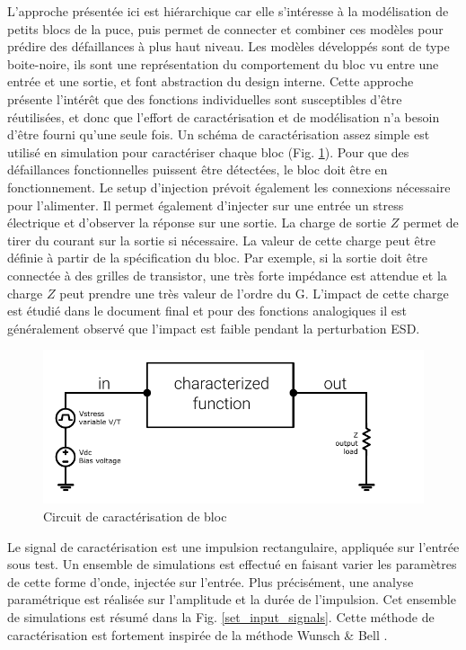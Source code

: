 L'approche présentée ici est hiérarchique car elle s'intéresse à la modélisation de petits blocs de la puce, puis permet de connecter et combiner ces modèles pour prédire des défaillances à plus haut niveau.
Les modèles développés sont de type boite-noire, ils sont une représentation du comportement du bloc vu entre une entrée et une sortie, et font abstraction du design interne.
Cette approche présente l'intérêt que des fonctions individuelles sont susceptibles d'être réutilisées, et donc que l'effort de caractérisation et de modélisation n'a besoin d'être fourni qu'une seule fois.
Un schéma de caractérisation assez simple est utilisé en simulation pour caractériser chaque bloc (Fig. \ref{block_function_cz}).
Pour que des défaillances fonctionnelles puissent être détectées, le bloc doit être en fonctionnement.
Le setup d'injection prévoit également les connexions nécessaire pour l'alimenter.
Il permet également d'injecter sur une entrée un stress électrique et d'observer la réponse sur une sortie.
La charge de sortie $Z$ permet de tirer du courant sur la sortie si nécessaire.
La valeur de cette charge peut être définie à partir de la spécification du bloc.
Par exemple, si la sortie doit être connectée à des grilles de transistor, une très forte impédance est attendue et la charge $Z$ peut prendre une très valeur de l'ordre du G\textOmega{}.
L'impact de cette charge est étudié dans le document final et pour des fonctions analogiques il est généralement observé que l'impact est faible pendant la perturbation ESD.

\begin{figure}[!h]
  \centering
  \includegraphics{src/1/figures/characterization_setup.pdf}
  \caption{Circuit de caractérisation de bloc}
  \label{block_function_cz}
\end{figure}

Le signal de caractérisation est une impulsion rectangulaire, appliquée sur l'entrée sous test.
Un ensemble de simulations est effectué en faisant varier les paramètres de cette forme d'onde, injectée sur l'entrée.
Plus précisément, une analyse paramétrique est réalisée sur l'amplitude et la durée de l'impulsion.
Cet ensemble de simulations est résumé dans la Fig. \ref{set_input_signals}.
Cette méthode de caractérisation est fortement inspirée de la méthode Wunsch & Bell \cite{wunsch-bell}.

